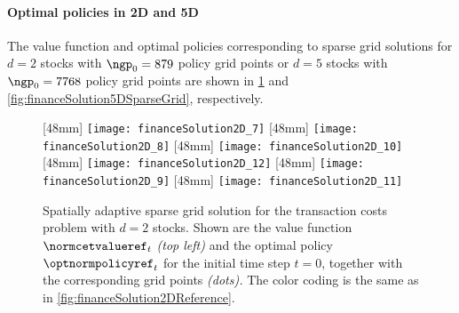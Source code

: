 \paragraph{Optimal policies in 2D and 5D}

The value function and optimal policies corresponding to
sparse grid solutions for
$d = 2$ stocks with $\ngp_0 = \num{879}$ policy grid points or
$d = 5$ stocks with $\ngp_0 = \num{7768}$ policy grid points
are shown in
\cref{fig:financeSolution2DSparseGrid} and
\cref{fig:financeSolution5DSparseGrid}, respectively.
\begin{figure}
  [48mm]{%
    \texttt{[image: financeSolution2D\_7]}%
  }%
  \hfill%
  [48mm]{%
    \texttt{[image: financeSolution2D\_8]}%
  }%
  \hfill%
  [48mm]{%
    \texttt{[image: financeSolution2D\_10]}%
  }%
  \\[2mm]%
  [48mm]{%
    \texttt{[image: financeSolution2D\_12]}%
  }%
  \hfill%
  [48mm]{%
    \texttt{[image: financeSolution2D\_9]}%
  }%
  \hfill%
  [48mm]{%
    \texttt{[image: financeSolution2D\_11]}%
  }%
  \caption[Sparse grid solution for the two-dimensional TCP]{%
    Spatially adaptive sparse grid solution for the transaction costs problem
    with $d = 2$ stocks.
    \vspace{-0.15em}%
    Shown are the value function $\normcetvalueref_t$ \emph{(top left)} and the
    optimal policy $\optnormpolicyref_t$ for the initial time step $t = 0$,
    together with the corresponding grid points \emph{(dots).}
    The color coding is the same as in
    \cref{fig:financeSolution2DReference}.%
  }%
  \label{fig:financeSolution2DSparseGrid}%
\end{figure}%
